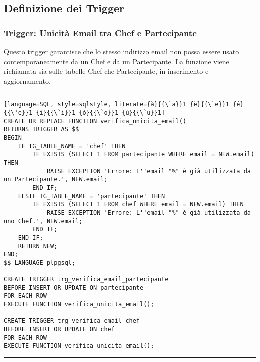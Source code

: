 \subsection{Definizione dei Trigger}

\setlength{\headheight}{17pt}

\subsubsection{Trigger: Unicità Email tra Chef e Partecipante}

Questo trigger garantisce che lo stesso indirizzo email non possa essere usato contemporaneamente da un Chef e da un Partecipante. La funzione viene richiamata sia sulle tabelle Chef che Partecipante, in inserimento e aggiornamento.

\noindent\rule{\textwidth}{0.4pt}
\begin{lstlisting}[language=SQL, style=sqlstyle, literate={à}{{\`a}}1 {è}{{\`e}}1 {é}{{\'e}}1 {ì}{{\`i}}1 {ò}{{\`o}}1 {ù}{{\`u}}1]
CREATE OR REPLACE FUNCTION verifica_unicita_email()
RETURNS TRIGGER AS $$
BEGIN
    IF TG_TABLE_NAME = 'chef' THEN
        IF EXISTS (SELECT 1 FROM partecipante WHERE email = NEW.email) THEN
            RAISE EXCEPTION 'Errore: L''email "%" è già utilizzata da un Partecipante.', NEW.email;
        END IF;
    ELSIF TG_TABLE_NAME = 'partecipante' THEN
        IF EXISTS (SELECT 1 FROM chef WHERE email = NEW.email) THEN
            RAISE EXCEPTION 'Errore: L''email "%" è già utilizzata da uno Chef.', NEW.email;
        END IF;
    END IF;
    RETURN NEW;
END;
$$ LANGUAGE plpgsql;

CREATE TRIGGER trg_verifica_email_partecipante
BEFORE INSERT OR UPDATE ON partecipante
FOR EACH ROW
EXECUTE FUNCTION verifica_unicita_email();

CREATE TRIGGER trg_verifica_email_chef
BEFORE INSERT OR UPDATE ON chef
FOR EACH ROW
EXECUTE FUNCTION verifica_unicita_email();
\end{lstlisting}
\noindent\rule{\textwidth}{0.4pt}

